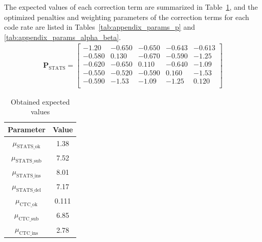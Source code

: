 \documentclass[sotsuron]{kuee}
\begin{document}
The expected values of each correction term are summarized in
Table~\ref{tab:appendix_mu_values}, and the optimized penalties and weighting parameters of the
correction terms for each code rate are listed in
Tables~\ref{tab:appendix_params_p} and \ref{tab:appendix_params_alpha_beta}.
\begin{align}
  \bm{P}_{\mathrm{STATS}} =
  \begin{bmatrix}
    -1.20 & -0.650 & -0.650 & -0.643 & -0.613 \\
    -0.580 & 0.130 & -0.670 & -0.590 & -1.25 \\
    -0.620 & -0.650 & 0.110 & -0.640 & -1.09 \\
    -0.550 & -0.520 & -0.590 & 0.160 & -1.53 \\
    -0.590 & -1.53 & -1.09 & -1.25 & 0.120 \\
  \end{bmatrix} \label{eq:appendix_P_STATS}
\end{align}

\begin{table}
  \centering
  \caption{Obtained expected values}
  \label{tab:appendix_mu_values}
  \begin{tabular}{c|c}
    \hline
    Parameter & Value \\
    \hline
    $\mu_{\mathrm{STATS}\_\mathrm{ok}}$ & 1.38 \\
    $\mu_{\mathrm{STATS}\_\mathrm{sub}}$ & 7.52 \\
    $\mu_{\mathrm{STATS}\_\mathrm{ins}}$ & 8.01 \\
    $\mu_{\mathrm{STATS}\_\mathrm{del}}$ & 7.17 \\
    $\mu_{\mathrm{CTC}\_\mathrm{ok}}$ & 0.111 \\
    $\mu_{\mathrm{CTC}\_\mathrm{sub}}$ & 6.85 \\
    $\mu_{\mathrm{CTC}\_\mathrm{ins}}$ & 2.78 \\
    \hline
  \end{tabular}
\end{table}
\end{document}
